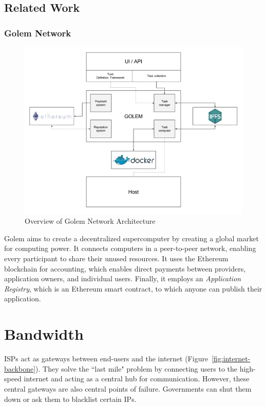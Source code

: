 	\subsection{Related Work}
		\subsubsection{Golem Network}
		\begin{figure}[h]
			\centering
			\includegraphics[width=\linewidth]{figures/golem-network}
			\caption{\label{fig:golem-network} Overview of Golem Network Architecture\protect\footnotemark}
		\end{figure}
		
		Golem\cite{golem2016whitepaper} aims to create a decentralized supercomputer by creating a global market for computing power. It connects computers in a peer-to-peer network, enabling every participant to share their unused resources. It uses the Ethereum blockchain for accounting, which enables direct payments between providers, application owners, and individual users. Finally, it employs an \textit{Application Registry}, which is an Ethereum smart contract, to which anyone can publish their application.

\cleardoublepage
\section{Bandwidth}
	ISPs act as gateways between end-users and the internet (Figure~\ref{fig:internet-backbone}). They solve the ``last mile" problem by connecting users to the high-speed internet and acting as a central hub for communication. However, these central gateways are also central points of failure. Governments can shut them down or ask them to blacklist certain IPs\cite{raval2016decentralized}.
	
